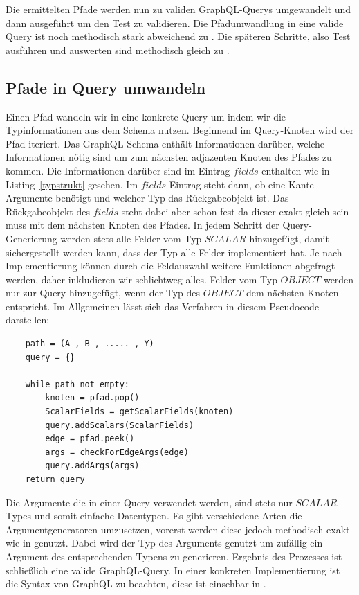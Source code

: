 Die ermittelten Pfade werden nun zu validen GraphQL-Querys umgewandelt und dann ausgeführt um den Test zu validieren.
Die Pfadumwandlung in eine valide Query ist noch methodisch stark abweichend zu \cite{property-based-testing}.
Die späteren Schritte, also Test ausführen und auswerten sind methodisch gleich zu \cite{property-based-testing}.

\subsection{Pfade in Query umwandeln}
\label{pfadquery}

Einen Pfad wandeln wir in eine konkrete Query um indem wir die Typinformationen aus dem Schema nutzen.
Beginnend im Query-Knoten wird der Pfad iteriert.
Das GraphQL-Schema enthält Informationen darüber, welche Informationen nötig sind um zum nächsten adjazenten Knoten des Pfades zu kommen.
Die Informationen darüber sind im Eintrag $fields$ enthalten wie in Listing~\ref{typstrukt} gesehen.
Im $fields$ Eintrag steht dann, ob eine Kante Argumente benötigt und welcher Typ das Rückgabeobjekt ist.
Das Rückgabeobjekt des $fields$ steht dabei aber schon fest da dieser exakt gleich sein muss mit dem nächsten Knoten des Pfades.
In jedem Schritt der Query-Generierung werden stets alle Felder vom Typ $SCALAR$ hinzugefügt, damit sichergestellt werden kann, dass
der Typ alle Felder implementiert hat.
Je nach Implementierung können durch die Feldauswahl weitere Funktionen abgefragt werden, daher inkludieren wir schlichtweg alles.
Felder vom Typ $OBJECT$ werden nur zur Query hinzugefügt, wenn der Typ des $OBJECT$ dem nächsten Knoten entspricht.
Im Allgemeinen lässt sich das Verfahren in diesem Pseudocode darstellen: \\

\begin{verbatim}
    path = (A , B , ..... , Y)
    query = {}

    while path not empty:
        knoten = pfad.pop()
        ScalarFields = getScalarFields(knoten)
        query.addScalars(ScalarFields)
        edge = pfad.peek()
        args = checkForEdgeArgs(edge)
        query.addArgs(args)
    return query
\end{verbatim}

Die Argumente die in einer Query verwendet werden, sind stets nur $SCALAR$ Types und somit einfache Datentypen.
Es gibt verschiedene Arten die Argumentgeneratoren umzusetzen, vorerst werden diese jedoch methodisch exakt wie in \cite{property-based-testing} genutzt.
Dabei wird der Typ des Arguments genutzt um zufällig ein Argument des entsprechenden Typens zu generieren.
Ergebnis des Prozesses ist schließlich eine valide GraphQL-Query.
In einer konkreten Implementierung ist die Syntax von GraphQL zu beachten, diese ist einsehbar in \cite[2.3 Language Operations]{graphqlspecification}.

